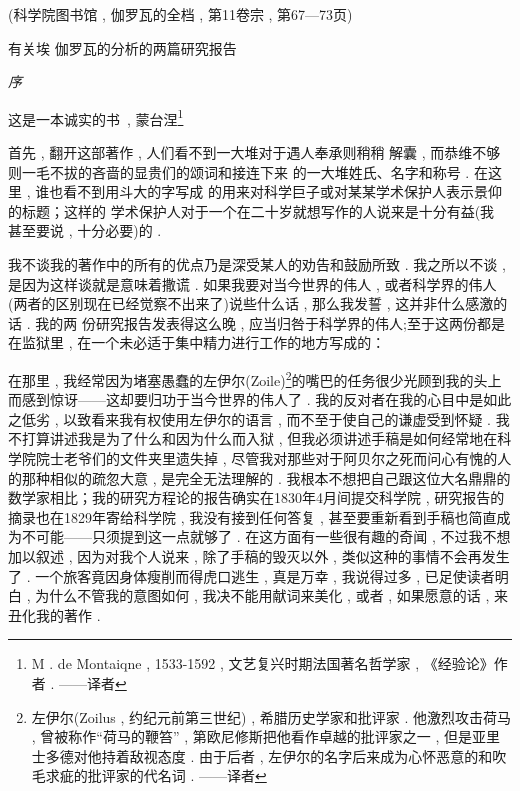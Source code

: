 \begin{center}
	(科学院图书馆 , 伽罗瓦的全档 ,  第11卷宗 , 第67—73页)
\end{center}

\begin{center}
	有关埃 \textbullet 伽罗瓦的分析的两篇研究报告
\end{center}

\begin{center}
	\emph{序}
\end{center}

\begin{flushright}
	这是一本诚实的书\ , 蒙台涅\footnote{M .  de Montaiqne , 1533-1592 , 文艺复兴时期法国著名哲学家 , 《经验论》作者 . ——译者}
\end{flushright}

首先 , 翻开这部著作 , 人们看不到一大堆对于遇人奉承则稍稍 解囊 , 而恭维不够则一毛不拔的吝啬的显贵们的颂词和接连下来 的一大堆姓氏、名字和称号 . 在这里 , 谁也看不到用斗大的字写成 的用来对科学巨子或对某某学术保护人表示景仰的标题；这样的 学术保护人对于一个在二十岁就想写作的人说来是十分有益(我 甚至要说 , 十分必要)的 . 

我不谈我的著作中的所有的优点乃是深受某人的劝告和鼓励所致 . 我之所以不谈 , 是因为这样谈就是意味着撒谎 . 如果我要对当今世界的伟人 , 或者科学界的伟人(两者的区别现在已经觉察不出来了)说些什么话 , 那么我发誓 , 这并非什么感激的话 . 我的两 份研究报告发表得这么晚 , 应当归咎于科学界的伟人;至于这两份都是在监狱里 , 在一个未必适于集中精力进行工作的地方写成的：

在那里 , 我经常因为堵塞愚蠢的左伊尔(Zoile)\footnote{左伊尔(Zoilus , 约纪元前第三世纪) , 希腊历史学家和批评家 . 他激烈攻击荷马 , 曾被称作“荷马的鞭笞” , 第欧尼修斯把他看作卓越的批评家之一 , 但是亚里士多德对他持着敌视态度 . 由于后者 , 左伊尔的名字后来成为心怀恶意的和吹毛求疵的批评家的代名词 . ——译者}的嘴巴的任务很少光顾到我的头上而感到惊讶——这却要归功于当今世界的伟人了 . 我的反对者在我的心目中是如此之低劣 , 以致看来我有权使用左伊尔的语言 , 而不至于使自己的谦虚受到怀疑 . 我不打算讲述我是为了什么和因为什么而入狱 , 但我必须讲述手稿是如何经常地在科学院院士老爷们的文件夹里遗失掉 , 尽管我对那些对于阿贝尔之死而问心有愧的人的那种相似的疏忽大意 , 是完全无法理解的 . 我根本不想把自己跟这位大名鼎鼎的数学家相比；我的研究方程论的报告确实在1830年4月间提交科学院 , 研究报告的摘录也在1829年寄给科学院 , 我没有接到任何答复 , 甚至要重新看到手稿也简直成为不可能——只须提到这一点就够了 . 在这方面有一些很有趣的奇闻 , 不过我不想加以叙述 , 因为对我个人说来 , 除了手稿的毁灭以外 , 类似这种的事情不会再发生了 . 一个旅客竟因身体瘦削而得虎口逃生 , 真是万幸 , 我说得过多 , 已足使读者明白 , 为什么不管我的意图如何 , 我决不能用献词来美化 , 或者 ,  如果愿意的话 , 来丑化我的著作 . 

